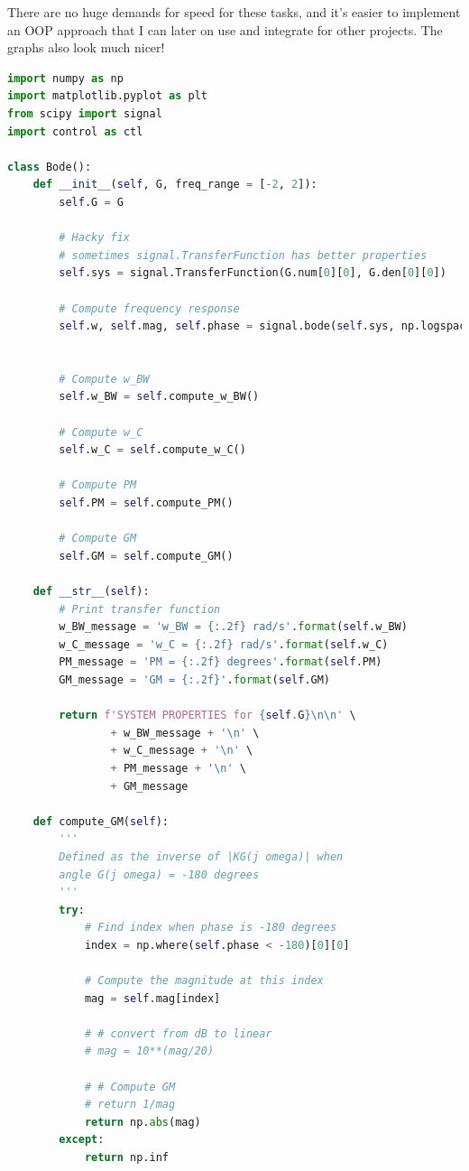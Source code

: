 \documentclass{article}
\begin{document}
There are no huge demands for speed for these tasks, and it's easier to implement an OOP approach that I can later on use and integrate for other projects. The graphs also look much nicer!

\begin{lstlisting}[language=Python]
import numpy as np
import matplotlib.pyplot as plt
from scipy import signal
import control as ctl

class Bode():
    def __init__(self, G, freq_range = [-2, 2]):
        self.G = G

        # Hacky fix
        # sometimes signal.TransferFunction has better properties
        self.sys = signal.TransferFunction(G.num[0][0], G.den[0][0])

        # Compute frequency response
        self.w, self.mag, self.phase = signal.bode(self.sys, np.logspace(freq_range[0], freq_range[1], 1000))


        # Compute w_BW
        self.w_BW = self.compute_w_BW()

        # Compute w_C
        self.w_C = self.compute_w_C()

        # Compute PM
        self.PM = self.compute_PM()

        # Compute GM
        self.GM = self.compute_GM()

    def __str__(self):
        # Print transfer function
        w_BW_message = 'w_BW = {:.2f} rad/s'.format(self.w_BW)
        w_C_message = 'w_C = {:.2f} rad/s'.format(self.w_C)
        PM_message = 'PM = {:.2f} degrees'.format(self.PM)
        GM_message = 'GM = {:.2f}'.format(self.GM)

        return f'SYSTEM PROPERTIES for {self.G}\n\n' \
                + w_BW_message + '\n' \
                + w_C_message + '\n' \
                + PM_message + '\n' \
                + GM_message
    
    def compute_GM(self):
        ''' 
        Defined as the inverse of |KG(j omega)| when
        angle G(j omega) = -180 degrees
        '''
        try:
            # Find index when phase is -180 degrees
            index = np.where(self.phase < -180)[0][0]

            # Compute the magnitude at this index
            mag = self.mag[index]

            # # convert from dB to linear
            # mag = 10**(mag/20)

            # # Compute GM
            # return 1/mag
            return np.abs(mag)
        except:
            return np.inf


\end{lstlisting}
\end{document}
